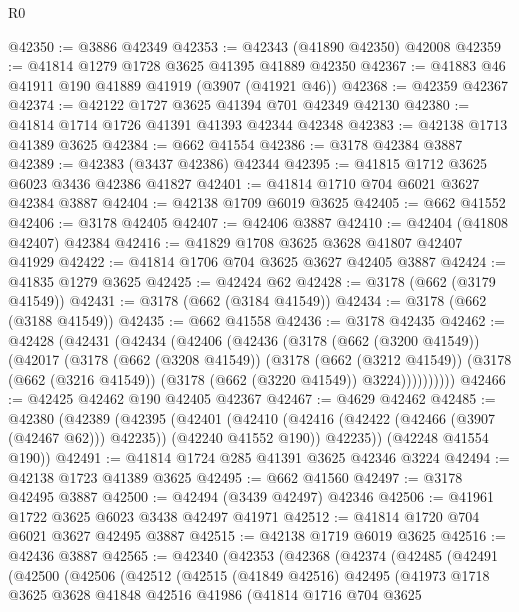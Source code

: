 \begin{lexlean}{R0}
\begin{coremodule}
@42350 := @3886 @42349
@42353 := @42343 (@41890 @42350) @42008
@42359 := @41814 @1279 @1728 @3625 @41395 @41889 @42350
@42367 := @41883 @46 @41911 @190 @41889 @41919 (@3907 (@41921 @46))
@42368 := @42359 @42367
@42374 := @42122 @1727 @3625 @41394 @701 @42349 @42130
@42380 := @41814 @1714 @1726 @41391 @41393 @42344 @42348
@42383 := @42138 @1713 @41389 @3625
@42384 := @662 @41554
@42386 := @3178 @42384 @3887
@42389 := @42383 (@3437 @42386) @42344
@42395 := @41815 @1712 @3625 @6023 @3436 @42386 @41827
@42401 := @41814 @1710 @704 @6021 @3627 @42384 @3887
@42404 := @42138 @1709 @6019 @3625
@42405 := @662 @41552
@42406 := @3178 @42405
@42407 := @42406 @3887
@42410 := @42404 (@41808 @42407) @42384
@42416 := @41829 @1708 @3625 @3628 @41807 @42407 @41929
@42422 := @41814 @1706 @704 @3625 @3627 @42405 @3887
@42424 := @41835 @1279 @3625
@42425 := @42424 @62
@42428 := @3178 (@662 (@3179 @41549))
@42431 := @3178 (@662 (@3184 @41549))
@42434 := @3178 (@662 (@3188 @41549))
@42435 := @662 @41558
@42436 := @3178 @42435
@42462 := @42428
    (@42431
      (@42434
        (@42406
          (@42436
            (@3178
              (@662 (@3200 @41549))
              (@42017
                (@3178
                  (@662 (@3208 @41549))
                  (@3178
                    (@662 (@3212 @41549))
                    (@3178 (@662 (@3216 @41549)) (@3178 (@662 (@3220 @41549)) @3224))))))))))
@42466 := @42425 @42462 @190 @42405 @42367
@42467 := @4629 @42462
@42485 := @42380
    (@42389
      (@42395
        (@42401
          (@42410 (@42416 (@42422 (@42466 (@3907 (@42467 @62))) @42235)) (@42240 @41552 @190))
          @42235))
      (@42248 @41554 @190))
@42491 := @41814 @1724 @285 @41391 @3625 @42346 @3224
@42494 := @42138 @1723 @41389 @3625
@42495 := @662 @41560
@42497 := @3178 @42495 @3887
@42500 := @42494 (@3439 @42497) @42346
@42506 := @41961 @1722 @3625 @6023 @3438 @42497 @41971
@42512 := @41814 @1720 @704 @6021 @3627 @42495 @3887
@42515 := @42138 @1719 @6019 @3625
@42516 := @42436 @3887
@42565 := @42340
    (@42353
      (@42368
        (@42374
          (@42485
            (@42491
              (@42500
                (@42506
                  (@42512
                    (@42515
                      (@41849 @42516)
                      @42495
                      (@41973
                        @1718
                        @3625
                        @3628
                        @41848
                        @42516
                        @41986
                        (@41814
                          @1716
                          @704
                          @3625

\end{coremodule}
\end{lexlean}
